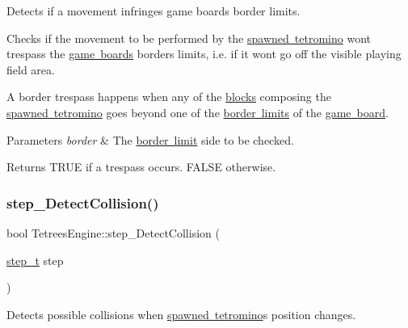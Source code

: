Detects if a movement infringes game board\textquotesingle{}s border limits. 

Checks if the movement to be performed by the \mbox{\hyperlink{classTetreesEngine_a26435ee2f02d9ba70d9e359745114f6e}{spawned tetromino}} won\textquotesingle{}t trespass the \mbox{\hyperlink{classTetreesEngine_a37d082a7816d6731b2703dd6d1a1cb97}{game board\textquotesingle{}s}} borders limits, i.\+e. if it won\textquotesingle{}t go off the visible playing field area.

A border trespass happens when any of the \mbox{\hyperlink{TetreesDefs_8hpp_ad8f0654cf997b7ea7eb14924d0b1ea33}{blocks}} composing the \mbox{\hyperlink{classTetreesEngine_a26435ee2f02d9ba70d9e359745114f6e}{spawned tetromino}} goes beyond one of the \mbox{\hyperlink{TetreesDefs_8hpp_a5dbb1ebfe8a9b95707ac161d3549ed8a}{border limits}} of the \mbox{\hyperlink{classTetreesEngine_a37d082a7816d6731b2703dd6d1a1cb97}{game board}}. 
\begin{DoxyParams}{Parameters}
{\em border} & The \mbox{\hyperlink{TetreesDefs_8hpp_a5dbb1ebfe8a9b95707ac161d3549ed8a}{border limit}} side to be checked. \\
\hline
\end{DoxyParams}
\begin{DoxyReturn}{Returns}
{\ttfamily T\+R\+UE} if a trespass occurs. {\ttfamily F\+A\+L\+SE} otherwise. 
\end{DoxyReturn}
\mbox{\label{classTetreesEngine_a25f8b896240ce2d2a34b1d968e75b5b6}} 
\subsubsection{\texorpdfstring{step\+\_\+\+Detect\+Collision()}{step\_DetectCollision()}}
{\footnotesize\ttfamily bool Tetrees\+Engine\+::step\+\_\+\+Detect\+Collision (\begin{DoxyParamCaption}\item[{\mbox{\hyperlink{TetreesDefs_8hpp_a4d5a793092a473f85b4c1f7faf62afed}{step\+\_\+t}}}]{step }\end{DoxyParamCaption})\hspace{0.3cm}{\ttfamily [private]}}



Detects possible collisions when \mbox{\hyperlink{classTetreesEngine_a26435ee2f02d9ba70d9e359745114f6e}{spawned tetromino}}\textquotesingle{}s position changes. 

